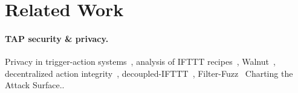 \section{Related Work}
\label{sec:related}

\paragraph{TAP security \& privacy.}
Privacy in trigger-action systems~\cite{DBLP:conf/sp/ChenCWSCF21}, analysis of
IFTTT
recipes~\cite{DBLP:conf/chi/UrHBLMPSL16,DBLP:conf/www/SurbatovichABDJ17,DBLP:conf/imc/MiQZW17},
Walnut~\cite{DBLP:journals/corr/abs-2009-12447}, decentralized action
integrity~\cite{DBLP:conf/ndss/FernandesRJP18},
decoupled-IFTTT~\cite{DBLP:journals/corr/FernandesRJP17},
Filter-Fuzz~\cite{DBLP:journals/access/XuZZCDG19}
Charting the Attack Surface.. \cite{DBLP:QiWang2019}

